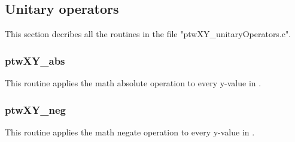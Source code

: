 \subsection{Unitary operators}
This section decribes all the routines in the file "ptwXY\_unitaryOperators.c".

\subsubsection{ptwXY\_abs}
This routine applies the math absolute operation to every y-value in .

\subsubsection{ptwXY\_neg}
This routine applies the math negate operation to every y-value in .
